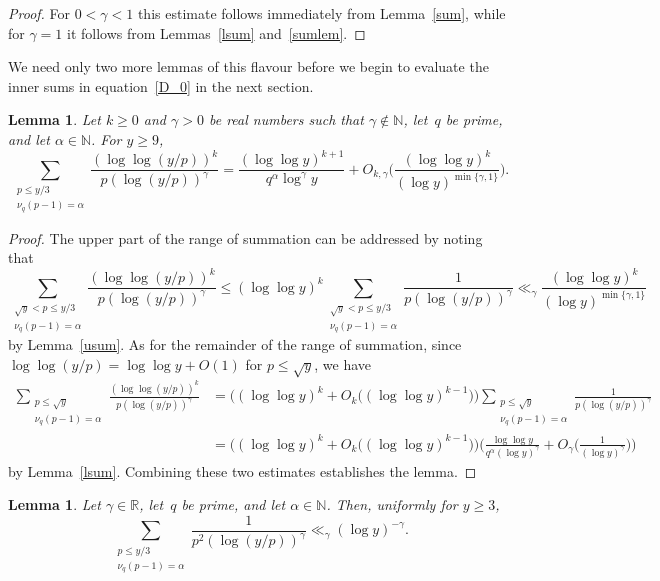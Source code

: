 \documentclass[12pt,reqno]{amsart}
\newtheorem{lemma}[theorem]{Lemma}
\theoremstyle{definition}
\newcommand{\N}{{\mathbb N}}
\newcommand{\R}{{\mathbb R}}
\begin{document}
\begin{proof}
For $0<\gamma<1$ this estimate follows immediately from Lemma~\ref{sum}, while for $\gamma=1$ it follows from Lemmas~\ref{lsum} and~\ref{sumlem}.
\end{proof}

We need only two more lemmas of this flavour before we begin to evaluate the inner sums in equation~\eqref{D_0} in the next section.

\begin{lemma} \label{recsum lemma}
Let $k\ge0$ and $\gamma>0$ be real numbers such that $\gamma\not\in\N$, let~$q$ be prime, and let $\alpha\in\N$. For $y\ge 9$,
\[
\sum_{\substack{p\le y/3 \\ \nu_q(p-1)=\alpha}}\frac{(\log\log(y/p))^k}{p(\log(y/p))^\gamma} = \frac{(\log\log y)^{k+1}}{q^\alpha\log^\gamma{y}}+O_{k,\gamma}\bigg( \frac{(\log\log y)^k}{(\log y)^{\min\{\gamma,1\}}}\bigg).
\]
\end{lemma}

\begin{proof}
The upper part of the range of summation can be addressed by noting that
\[
\sum_{\substack{\sqrt y<p\le y/3\\ \nu_q(p-1)=\alpha}}\frac{(\log\log(y/p))^k}{p(\log(y/p))^\gamma} \le (\log\log y)^k\sum_{\substack{\sqrt y<p\le y/3\\ \nu_q(p-1)=\alpha}}\frac{1}{p(\log(y/p))^\gamma} \ll_\gamma \frac{(\log\log y)^k}{(\log y)^{\min\{\gamma,1\}}}
\]
by Lemma~\ref{usum}. As for the remainder of the range of summation,
since $\log\log(y/p) = \log\log y + O(1)$ for $p\le \sqrt y$, we have
\begin{align*}
\sum_{\substack{p\le \sqrt y\\ \nu_q(p-1)=\alpha}}\frac{(\log\log(y/p))^k}{p(\log(y/p))^\gamma} &= \big( (\log\log y)^k+O_k\big( (\log\log y)^{k-1} \big) \big) \sum_{\substack{p\le \sqrt y\\ \nu_q(p-1)=\alpha}}\frac{1}{p(\log(y/p))^\gamma} \\
&= \big( (\log\log y)^k+O_k\big( (\log\log y)^{k-1} \big) \big) \bigg( \frac{\log\log y}{q^\alpha(\log y)^\gamma} + O_\gamma\bigg( \frac 1{(\log y)^\gamma} \bigg) \bigg)
\end{align*}
by Lemma~\ref{lsum}. Combining these two estimates establishes the lemma.
\end{proof}

\begin{lemma} \label{sumsq}
Let $\gamma\in\R$, let~$q$ be prime, and let $\alpha\in\N$. Then, uniformly for $y\ge3$,
\[
\sum_{\substack{p\le y/3 \\ \nu_q(p-1)=\alpha}} \frac1{p^2(\log(y/p))^\gamma} \ll_\gamma (\log y)^{-\gamma}.
\]
\end{lemma}
\end{document}
